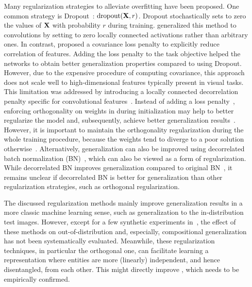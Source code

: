 Many regularization strategies to alleviate overfitting have been proposed. One common strategy is Dropout~\citep{hinton2012improving}: $\text{dropout}(\mathbf{X}, r)$. Dropout stochastically sets to zero the values of $\mathbf{X}$ with probability $r$ during training. \citet{ghiasi2018dropblock} generalized this method to convolutions by setting to zero locally connected activations rather than arbitrary ones.
In contrast, \citet{cogswell2015reducing} proposed a covariance loss penalty to explicitly reduce correlation of features.
Adding the loss penalty to the task objective helped the networks to obtain better generalization properties compared to using Dropout. 
However, due to the expensive procedure of computing covariance, this approach does not scale well to high-dimensional features typically present in visual tasks. 
This limitation was addressed by introducing a locally connected decorrelation penalty specific for convolutional features~\citep{rodriguez2016regularizing}.
Instead of adding a loss penalty~\citep{cogswell2015reducing,rodriguez2016regularizing}, enforcing orthogonality on weights in \cnns during initialization may help to better regularize the model and, subsequently, achieve better generalization results~\citep{bansal2018can,wang2020orthogonal}. However, it is important to maintain the orthogonality regularization during the whole training procedure, because the weights tend to diverge to a poor solution otherwise~\citep{wang2020orthogonal}. Alternatively, generalization can also be improved using decorrelated batch normalization (BN)~\citep{huang2018decorrelated}, which can also be viewed as a form of regularization. While decorrelated BN improves generalization compared to original BN~\citep{ioffe2015batch}, it remains unclear if decorrelated BN is better for generalization than other regularization strategies, such as orthogonal regularization.

The discussed regularization methods mainly improve generalization results in a more classic machine learning sense, such as generalization to the in-distribution test images.
However, except for a few synthetic experiments in~\citep{cogswell2015reducing}, the effect of these methods on out-of-distribution and, especially, compositional generalization has not been systematically evaluated. Meanwhile, these regularization techniques, in particular the orthogonal one, can facilitate learning a representation where entities are more (linearly) independent, and hence disentangled, from each other. This might directly improve \cgshort, which needs to be empirically confirmed.
